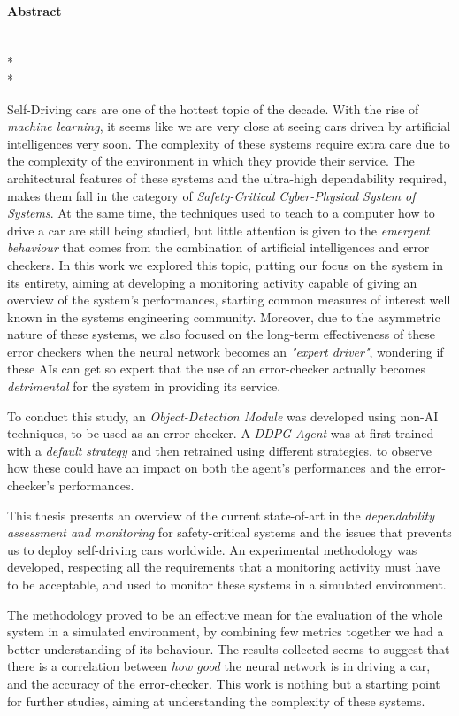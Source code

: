 \paragraph{Abstract}\mbox{}\\*\\*

Self-Driving cars are one of the hottest topic of the decade. With the rise of \textsl{machine learning}, it seems like we are very close at seeing cars driven by artificial intelligences very soon. The complexity of these systems require extra care due to the complexity of the environment in which they provide their service. The architectural features of these systems and the ultra-high dependability required, makes them fall in the category of \textsl{Safety-Critical Cyber-Physical System of Systems}.
At the same time, the techniques used to teach to a computer how to drive a car are still being studied, but little attention is given to the \textsl{emergent behaviour} that comes from the combination of artificial intelligences and error checkers.
In this work we explored this topic, putting our focus on the system in its entirety, aiming at developing a monitoring activity capable of giving an overview of the system's performances, starting common measures of interest well known in the systems engineering community.
Moreover, due to the asymmetric nature of these systems, we also focused on the long-term effectiveness of these error checkers when the neural network becomes an \textsl{"expert driver"}, wondering if these AIs can get so expert that the use of an error-checker actually becomes \textsl{detrimental} for the system in providing its service.

To conduct this study, an \textsl{Object-Detection Module} was developed using non-AI techniques, to be used as an error-checker. A \textsl{DDPG Agent} was at first trained with a \textsl{default strategy} and then retrained using different strategies, to observe how these could have an impact on both the agent's performances and the error-checker's performances.

This thesis presents an overview of the current state-of-art in the \textsl{dependability assessment and monitoring} for safety-critical systems and the issues that prevents us to deploy self-driving cars worldwide. An experimental methodology was developed, respecting all the requirements that a monitoring activity must have to be acceptable, and used to monitor these systems in a simulated environment.

The methodology proved to be an effective mean for the evaluation of the whole system in a simulated environment, by combining few metrics together we had a better understanding of its behaviour. The results collected seems to suggest that there is a correlation between \textsl{how good} the neural network is in driving a car, and the accuracy of the error-checker.
This work is nothing but a starting point for further studies, aiming at understanding the complexity of these systems.